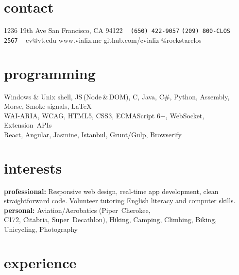 \documentclass[]{cv-style}          %
\begin{document}
\lastupdated


\begin{aside}
%
\section{contact}
1236 19th Ave
San Francisco, CA 94122
~
\texttt{\color{gray}(650) 422-9057}
\texttt{\color{gray}(209) 800-CLOS}
\texttt{\color{gray}          2567}
~
cv@vt.edu
www.vializ.me
github.com/cvializ
@rockstarclos
%
\section{programming}
Windows \& Unix shell, JS\,(Node\,\&\,DOM), C, Java, C\#, Python, Assembly, Morse, Smoke signals, \LaTeX{}%
\\[\baselineskip]%
WAI-ARIA, WCAG, HTML5, CSS3, ECMAScript 6+, WebSocket, {Extension~APIs}%
\\[\baselineskip]%
React, Angular, Jasmine, Istanbul, Grunt/Gulp, Browserify%
%
\section{interests}
\textbf{professional:} Responsive web design, real-time app development, clean straightforward code. Volunteer tutoring English literacy and computer skills.
\textbf{personal:} Aviation/Aerobatics ({Piper~Cherokee},\\{C172}, Citabria, {Super~Decathlon}), Hiking, Camping, Climbing, Biking, Unicycling, Photography
%
\end{aside}


\section{experience}
\end{document}
